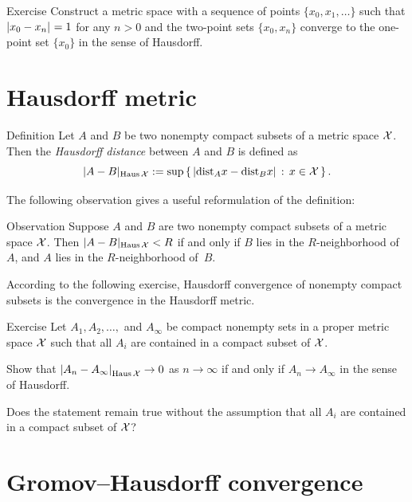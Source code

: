 \begin{thm}{Exercise}\label{ex:two>one}
Construct a metric space with a sequence of points $\{x_0,x_1,\dots\}$ such that $\dist{x_0}{x_n}{}=1$ for any $n>0$ and the two-point sets $\{x_0,x_n\}$ converge to the one-point set $\{x_0\}$ in the sense of Hausdorff.
\end{thm}


\section{Hausdorff metric}\label{sec:Hausdorff metric}

\begin{thm}{Definition}\label{def:hausdorff-convergence}
Let $A$ and $B$ be two nonempty compact subsets of a metric space $\mathcal{X}$.
Then the \emph{Hausdorff distance} between $A$ and $B$ is defined as 
$$|A-B|_{\Haus\spc{X}}
\df
\sup\set{|\distfun_Ax-\distfun_Bx|}{x\in \spc{X}}.
$$

\end{thm}

The following observation gives a useful reformulation of the definition:

\begin{thm}{Observation}\label{obs:Haus-nbhds}
Suppose $A$ and $B$ are two nonempty compact subsets of a metric space $\mathcal{X}$.
Then $|A-B|_{\operatorname{\rm Haus}\nolimits\mathcal{X}}< R$ if and only if
$B$ lies in the $R$-neighborhood of $A$, 
and 
$A$ lies in the $R$-neighborhood of~$B$.
\end{thm}

According to the following exercise, Hausdorff convergence of nonempty compact subsets is the convergence in the Hausdorff metric.

\begin{thm}{Exercise}\label{ex:Haus-conv}
Let $A_1,A_2,\dots,$ and $A_\infty$ be compact nonempty sets in a proper metric space $\mathcal{X}$ such that all $A_i$ are contained in a compact subset of $\mathcal{X}$.


Show that $\dist{A_n}{A_\infty}{\Haus\spc{X}}\to 0$ as $n\to\infty$
if and only if $A_n\to A_\infty$ in the sense of Hausdorff.

Does the statement remain true without the assumption that all $A_i$ are contained in a compact subset of $\mathcal{X}$?


\end{thm}

\section{Gromov--Hausdorff convergence}\label{sec:Gromov--Hausdorff}

